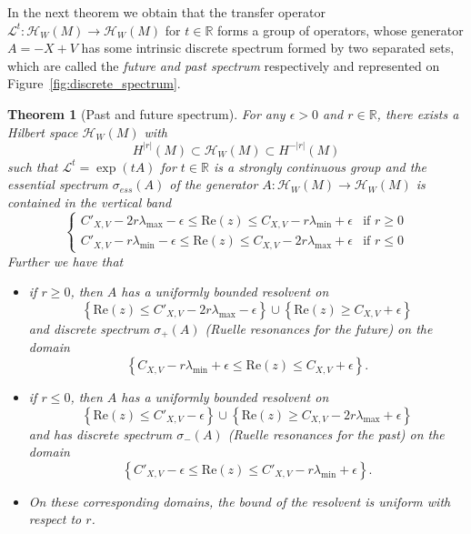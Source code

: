 \documentclass[10pt]{amsart}
\newtheorem{theo}{Theorem}[section]
\theoremstyle{definition}\newtheorem{defi}[theo]{Definition}\newtheorem{rema}[theo]{Remark}\newtheorem{exam}[theo]{Example}\newtheorem{exem}[theo]{Example}\newtheorem{nota}[theo]{Notation}
\newcommand{\clH}{\mathcal{H}}
\newcommand{\clL}{\mathcal{L}}
\newcommand{\Ree}{\mathrm{Re}}
\newcommand{\bbR}{\mathbb{R}}
\begin{document}
In the next theorem we obtain that the transfer operator $\clL^{t}:\clH _{W}\left(M\right)\rightarrow\clH _{W}\left(M\right)$ for $t\in\bbR$ forms a group of operators, whose generator $A=-X+V$ has some intrinsic discrete spectrum formed by two separated sets, which are called the \emph{future and past spectrum} respectively and represented on Figure~\ref{fig:discrete_spectrum}.
\begin{cBoxB}{}
\begin{theo}[Past and future spectrum]\label{thm:grey-band}
For any $\epsilon>0$ and $r\in\bbR$, there exists a Hilbert space $\clH _{W}(M)$ with
\[
H^{|r|}\left(M\right)\subset\clH _{W}\left(M\right)\subset H^{-|r|}\left(M\right)
\]
such that $\clL^{t}=\exp(tA)$ for $t\in\bbR$ is a \emph{strongly continuous group} and the essential spectrum $\sigma_{ess}(A)$ of the generator $A:\clH _{W}(M)\rightarrow\clH _{W}\left(M\right)$ is contained in the vertical band
\begin{equation}
\begin{cases}
C'_{X,V}-2r\lambda_{\max}-\epsilon\leq\Ree\left(z\right)\leq C_{X,V}-r\lambda_{\min}+\epsilon & \text{if }r\ge0\\
C'_{X,V}-r\lambda_{\min}-\epsilon\leq\Ree\left(z\right)\leq C_{X,V}-2r\lambda_{\max}+\epsilon & \text{if }r\le0
\end{cases}\label{eq:bound_for_ess_spec}
\end{equation}
Further we have that
\begin{itemize}
\item if $r\geq0$, then $A$ has a uniformly bounded resolvent on
\[
\left\{ \Ree\left(z\right)\leq C'_{X,V}-2r\lambda_{\max}-\epsilon\right\} \cup\left\{ \Ree\left(z\right)\geq C_{X,V}+\epsilon\right\}
\]
and discrete spectrum $\sigma_{+}\left(A\right)$ (Ruelle resonances for the future) on the domain
\[
\left\{C_{X,V}-r\lambda_{\min}+\epsilon\leq\Ree\left(z\right)\leq C_{X,V}+\epsilon\right\}.
\]
\item if $r\leq0$, then $A$ has a uniformly bounded resolvent on
\[
\left\{ \Ree\left(z\right)\leq C'_{X,V}-\epsilon\right\} \cup\left\{ \Ree\left(z\right)\geq C_{X,V}-2r\lambda_{\max}+\epsilon\right\}
\]
and has discrete spectrum $\sigma_{-}\left(A\right)$ (Ruelle resonances for the past) on the domain
\[
\left\{C'_{X,V}-\epsilon\leq\Ree\left(z\right)\leq C'_{X,V}-r\lambda_{\min}+\epsilon\right\}.
\]
\item On these corresponding domains, the bound of the resolvent is uniform with respect to $r$.
\end{itemize}
\end{theo}
\end{cBoxB}
\end{document}
